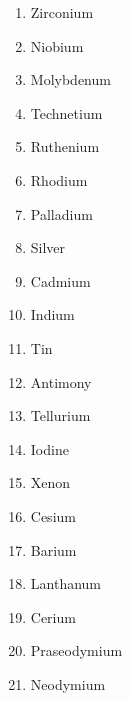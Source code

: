 \begin{enumerate}
\begin{multicols}{3}
\begin{enumerate}[label={\thaialphs*.}]
        \item Zirconium
        \item Niobium
        \item Molybdenum
        \item Technetium
        \item Ruthenium
        \item Rhodium
        \item Palladium
        \item Silver
        \item Cadmium
        \item Indium
        \item Tin
        \item Antimony
        \item Tellurium
        \item Iodine
        \item Xenon
        \item Cesium
        \item Barium
        \item Lanthanum
        \item Cerium
        \item Praseodymium
        \item Neodymium
    \end{enumerate}
    \end{multicols}


\end{enumerate}
